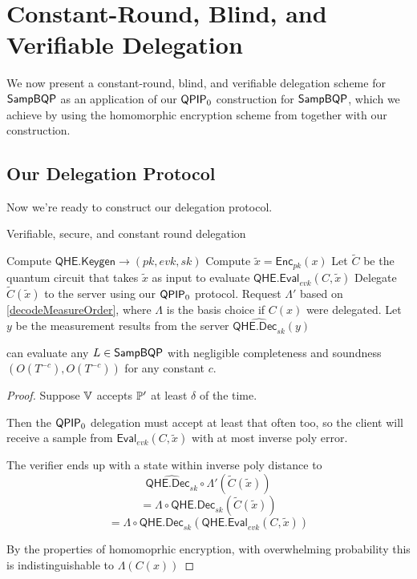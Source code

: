 \section{Constant-Round, Blind, and Verifiable Delegation}

We now present a constant-round, blind, and verifiable delegation scheme for $\operatorname{\mathsf{SampBQP}}$ as an application of our $\operatorname{\mathsf{QPIP}}_0$ construction for $\operatorname{\mathsf{SampBQP}}$,
which we achieve by using the homomorphic encryption scheme from \cite{mahadev_qfhe} together with our construction.

\subsection{Our Delegation Protocol}

Now we're ready to construct our delegation protocol.

\begin{algorithm}
	\caption{Verifiable, secure, and constant round delegation}
	\label{ProtoPriv}
	\begin{algorithmic}[1]
			\State Compute $\mathsf{QHE.Keygen}\rightarrow(pk, evk, sk)$
			\State Compute $\tilde{x}=\mathsf{Enc}_{pk}(x)$
			\State Let $\tilde{C}$ be the quantum circuit that takes $\tilde{x}$ as input to evaluate $\mathsf{QHE.Eval}_{evk}(C, \tilde{x})$
			\State Delegate $\tilde{C}(\tilde{x})$ to the server using our $\operatorname{\mathsf{QPIP}}_0$ protocol.
			\State Request $\Lambda'$ based on \autoref{decodeMeasureOrder}, where $\Lambda$ is the basis choice if $C(x)$ were delegated.
			\State Let $y$ be the measurement results from the server
			\State \Return $\widehat{\mathsf{QHE.Dec}_{sk}}(y)$
		\EndProcedure
	\end{algorithmic}
\end{algorithm}

\begin{thm}
    \label{QPIP1thm}
	 can evaluate any $L\in\operatorname{\mathsf{SampBQP}}$ with negligible completeness and soundness $(O(T^{-c}), O(T^{-c}))$ for any constant $c$.
\end{thm}
\begin{proof}
	Suppose $\mathbb{V}$ accepts $\mathbb{P}'$ at least $\delta$ of the time.

	Then the $\operatorname{\mathsf{QPIP}}_0$ delegation must accept at least that often too,
	so the client will receive a sample from $\mathsf{Eval}_{evk}(C, \tilde{x})$ with at most inverse poly error. 

	The verifier ends up with a state within inverse poly distance to
		$$\widehat{\mathsf{QHE.Dec}_{sk}}\circ\Lambda'(\tilde{C}(\tilde{x}))$$
		$$=\Lambda\circ\mathsf{QHE.Dec}_{sk}(\tilde{C}(\tilde{x}))$$
		$$=\Lambda\circ\mathsf{QHE.Dec}_{sk}(\mathsf{QHE.Eval}_{evk}(C, \tilde{x}))$$

	By the properties of homomoprhic encryption, with overwhelming probability this is indistinguishable to  $\Lambda(C(x))$
\end{proof}

